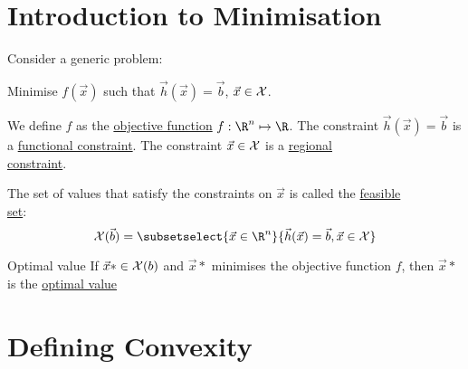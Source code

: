 \documentclass[../Main.tex]{subfiles}
\begin{document}
\section{Introduction to Minimisation} %
Consider a generic problem:

Minimise $f(\vec{x})$ such that $\vec{h}(\vec{x}) = \vec{b}$, $\vec{x} \in \mathcal{X}$.

We define $f$ as the \underline{objective function} $f : \R^n \mapsto \R$. The constraint $\vec{h}(\vec{x}) = \vec{b}$ is a \underline{functional constraint}. The constraint $\vec{x} \in \mathcal{X}$ is a \underline{regional}\\\underline{constraint}.

The set of values that satisfy the constraints on $\vec{x}$ is called the \underline{feasible}\\\underline{set}:
\begin{equation}
    \Xset(\vec{b}) = \subsetselect{\vec{x} \in \R^n}{\vec{h}(\vec{x}) = \vec{b}, \vec{x} \in \Xset}
    \label{eqnFeasibleSet}
\end{equation}
\begin{definition}{Optimal value}
    If $\vec{x}* \in \mathcal{X}(b)$ and $\vec{x}*$ minimises the objective function $f$, then $\vec{x}*$ is the \underline{optimal value}
\end{definition}
\section{Defining Convexity}
\end{document}
